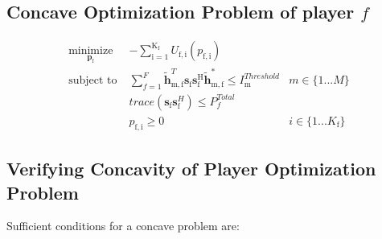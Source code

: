 \documentclass[12pt,a4paper]{report}
\begin{document}
\subsection{Concave Optimization Problem of player $f$}


	\begin{subequations}
	\label{optim}
	\begin{align}
	    \underset{\mathbf{p}_{\mathrm{f}} }{\text{minimize}} \;
	    & - \sum_{\mathrm{i=1}}^{\mathrm{K_f}}
    	U_{\mathrm{f,i}}(p_{\mathrm{f,i}}) \label{player_opt_c} \\
	    \text{subject to} \; &
	  \sum^F_{f=1} \mathbf{\tilde{h}}_{\mathrm{m,f}}^T  \mathbf{s}_{\mathrm{f}} 						
	\mathbf{s_{\mathrm{f}}^{\mathrm{H}}} \mathbf{\tilde{h}_{\mathrm{m,f}}^*} \leq I^{Threshold}		
	_{\mathrm{m}} & m \in \{1 ...M\} 
		\label{interference_const_c}\\
        & trace(\mathbf{s}_\mathrm{f}\mathbf{s}_\mathrm{f}^H)  \leq P^{Total}_{f}  \label{power_const_c}\\
        & p_{\mathrm{f,i}} \geq 0 &  i \in \{1 ...K_{\mathrm{f}}\} \label{pos_power_const_c}
	\end{align}
	\end{subequations}


\subsection{Verifying Concavity of Player Optimization Problem}

Sufficient conditions for a concave problem are:
\end{document}
